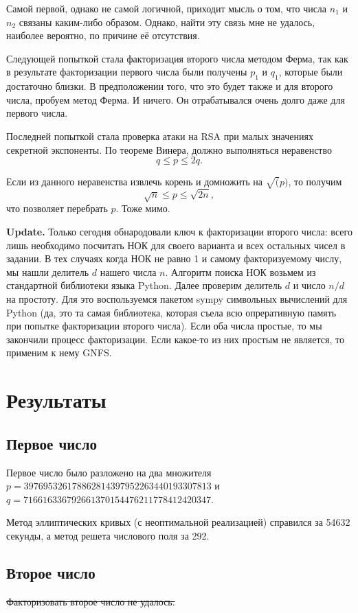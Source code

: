 \documentclass[a4paper,12pt]{article}
\begin{document}
Самой первой, однако не самой логичной, приходит мысль о том,
что числа $n_1$ и $n_2$ связаны каким-либо образом. Однако, найти эту связь
мне не удалось, наиболее вероятно, по причине её отсутствия.

Следующей попыткой стала факторизация второго числа методом
Ферма, так как в результате факторизации первого числа
были получены $p_1$ и $q_1$, которые были достаточно близки.
В предположении того, что это будет также и для второго числа,
пробуем метод Ферма. И ничего. Он отрабатывался очень долго даже для
первого числа.


Последней попыткой стала проверка атаки на RSA при малых
значениях секретной экспоненты. По теореме Винера, должно
выполняться неравенство $$q \le p \le 2q.$$

Если из данного неравенства извлечь корень и домножить на $\sqrt(p)$,
то получим
$$\sqrt{n} \le p \le \sqrt{2n},$$
что позволяет перебрать $p$. Тоже мимо.

\textbf{Update.} Только сегодня обнародовали ключ к факторизации
второго числа: всего лишь необходимо посчитать НОК для своего варианта
и всех остальных чисел в задании. В тех случаях когда НОК не равно
1 и самому факторизуемому числу, мы нашли делитель $d$ нашего числа $n$.
Алгоритм поиска НОК возьмем из стандартной библиотеки языка Python.
Далее проверим делитель $d$ и число $n / d$ на простоту. Для это
воспользуемся пакетом sympy символьных вычислений для Python (да,
это та самая библиотека, которая съела всю опреративную память при попытке
факторизации второго числа). Если оба числа простые, то мы закончили процесс
факторизации. Если какое-то из них простым не является, то применим к нему
GNFS.

\section{Результаты}
\subsection{Первое число}
Первое число было разложено на два множителя
$p = 397695326178862814397952263440193307813$ и
$q = 716616336792661370154476211778412420347$.

Метод эллиптических кривых (с неоптимальной реализацией) справился
за 54632 секунды, а метод решета числового поля за 292.

\subsection{Второе число}
\sout{Факторизовать второе число не удалось.}
\end{document}
